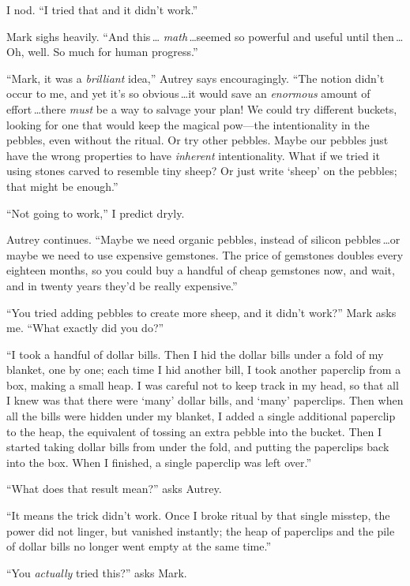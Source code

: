 {
 I nod. ``I tried that and it
didn't work.''}

{
 Mark sighs heavily. ``And this\,\ldots
\textit{math}\,\ldots seemed so powerful and useful until then\,\ldots Oh,
well. So much for human progress.''}

{
 ``Mark, it was a \textit{brilliant}
idea,'' Autrey says encouragingly.
``The notion didn't occur to me, and
yet it's so obvious\,\ldots it would save an
\textit{enormous} amount of effort\,\ldots there \textit{must} be a way
to salvage your plan! We could try different buckets, looking for one
that would keep the magical pow---the intentionality in the pebbles,
even without the ritual. Or try other pebbles. Maybe our pebbles just
have the wrong properties to have \textit{inherent} intentionality.
What if we tried it using stones carved to resemble tiny sheep? Or just
write `sheep' on the pebbles; that might
be enough.''}

{
 ``Not going to work,'' I
predict dryly.}

{
 Autrey continues. ``Maybe we need organic
pebbles, instead of silicon pebbles\,\ldots or maybe we need to use
expensive gemstones. The price of gemstones doubles every eighteen
months, so you could buy a handful of cheap gemstones now, and wait,
and in twenty years they'd be really
expensive.''}

{
 ``You tried adding pebbles to create more sheep,
and it didn't work?'' Mark asks me.
``What exactly did you do?''}

{
 ``I took a handful of dollar bills. Then I hid
the dollar bills under a fold of my blanket, one by one; each time I
hid another bill, I took another paperclip from a box, making a small
heap. I was careful not to keep track in my head, so that all I knew
was that there were `many' dollar bills,
and `many' paperclips. Then when all the
bills were hidden under my blanket, I added a single additional
paperclip to the heap, the equivalent of tossing an extra pebble into
the bucket. Then I started taking dollar bills from under the fold, and
putting the paperclips back into the box. When I finished, a single
paperclip was left over.''}

{
 ``What does that result mean?''
asks Autrey.}

{
 ``It means the trick didn't work.
Once I broke ritual by that single misstep, the power did not linger,
but vanished instantly; the heap of paperclips and the pile of dollar
bills no longer went empty at the same time.''}

{
 ``You \textit{actually} tried
this?'' asks Mark.}


